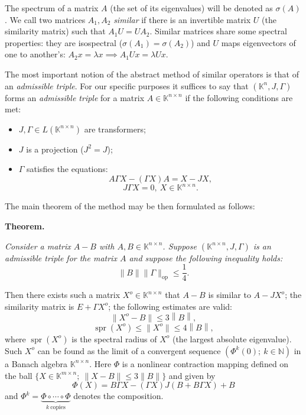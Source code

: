 \documentclass[a4paper]{jpconf}
\begin{document}
The spectrum of a matrix \( A \)
    (the set of its eigenvalues)
    will be denoted as \( \sigma(A) \).
We call two matrices \( A_1, A_2 \) \emph{similar}
    if there is an invertible matrix \( U \)
    (the similarity matrix)
    such that \( A_1 U = U A_2 \).
Similar matrices share some spectral properties:
    they are isospectral (\( \sigma(A_1) = \sigma(A_2) \))
    and \( U \) maps eigenvectors of one to another's:
    \( A_2 x = \lambda x \implies A_1 U x = \lambda U x \).

The most important notion
    of the abstract method of similar operators
    is that of an \emph{admissible triple}.
For our specific purposes it suffices to say
    that \( (\mathbb{K}^n, J, \Gamma) \)
    forms an \emph{admissible triple}
    for a matrix \( A\in\mathbb{K}^{n{\times}n} \)
    if the following conditions are met:
\begin{itemize}
    \item \( J, \Gamma \in L(\mathbb{K}^{n{\times}n}) \)
        are transformers;
    \item \( J \) is a projection (\( J^2 = J \));
    \item  \( \Gamma \) satisfies the equations:
        \[
            A \Gamma X - (\Gamma X) A = X - JX,
        \]
        \[
            J\Gamma X = 0,\ X\in\mathbb{K}^{n{\times}n}.
        \]
\end{itemize}

The main theorem of the method
    may be then formulated as follows:

\begin{center}
\textbf{Theorem.}
{\it
    Consider a matrix \( A - B \)
        with \( A, B \in \mathbb{K}^{n{\times}n} \).
    Suppose \( (\mathbb{K}^{n{\times}n}, J, \Gamma) \)
        is an admissible triple for the matrix \( A \)
        and suppose the following inequality holds:
        \[
            \|B\|\|\Gamma\|_{\mathrm{op}} \leq \frac14.
        \]

    Then there exists such a matrix \( X^o\in\mathbb{K}^{n{\times}n} \)
        that \( A - B \) is similar to \( A - J X^o \);
        the similarity matrix is \( E + \Gamma X^o \);
        the following estimates are valid:
        \[
            \|X^o - B\| \leq 3 \left\|B\right\|,
        \]
        \[
            \operatorname{spr}(X^o) \leq \|X^o\| \leq 4 \left\|B\right\|,
        \]
        where \( \operatorname{spr}(X^o) \)
        is the spectral radius of \( X^o \) (the largest absolute eigenvalue).
    Such \( X^o \) can be found as the limit of a convergent sequence
        \( \left( \Phi^k(0);\ k\in\mathbb{N} \right) \)
        in a Banach algebra \( \mathbb{K}^{n{\times}n} \).
        Here \( \Phi \) is a nonlinear contraction mapping
        defined on the ball \( \{X\in\mathbb{K}^{m{\times}n};\ \|X-B\|\leq 3\|B\| \} \)
        and given by
    \[
        \Phi(X) = B\Gamma X - (\Gamma X)J(B + B\Gamma X) + B
    \]
        and \( \Phi^k = \underbrace{\Phi\circ\cdots\circ\Phi}_{k\ \text{copies}} \)
        denotes the composition.
}
\end{center}
\end{document}
